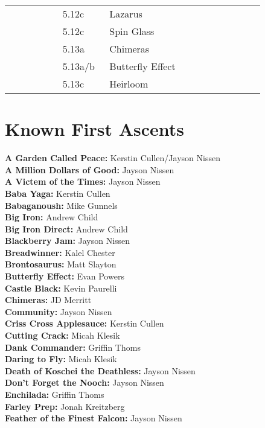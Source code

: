 \begin{flushleft}
\begin{center}
\begin{supertabular}{p{0.18\linewidth}p{0.13\linewidth}p{0.45\linewidth}p{0.08\linewidth}}
&5.12c&Lazarus & \pageref{vr:Lazarus} \\
&5.12c&Spin Glass & \pageref{rt:Spin Glass} \\
&5.13a&Chimeras & \pageref{rt:Chimeras} \\
&5.13a/b&Butterfly Effect & \pageref{rt:Butterfly Effect} \\
&5.13c&Heirloom & \pageref{rt:Heirloom} \\
\end{supertabular}
\end{center}
\section{Known First Ascents}
\textbf{A Garden Called Peace:} Kerstin Cullen/Jayson Nissen\\
\textbf{A Million Dollars of Good:} Jayson Nissen\\
\textbf{A Victem of the Times:} Jayson Nissen\\
\textbf{Baba Yaga:} Kerstin Cullen\\
\textbf{Babaganoush:} Mike Gunnels\\
\textbf{Big Iron:} Andrew Child\\
\textbf{Big Iron Direct:} Andrew Child\\
\textbf{Blackberry Jam:} Jayson Nissen\\
\textbf{Breadwinner:} Kalel Chester\\
\textbf{Brontosaurus:} Matt Slayton\\
\textbf{Butterfly Effect:} Evan Powers\\
\textbf{Castle Black:} Kevin Paurelli\\
\textbf{Chimeras:} JD Merritt\\
\textbf{Community:} Jayson Nissen\\
\textbf{Criss Cross Applesauce:} Kerstin Cullen\\
\textbf{Cutting Crack:} Micah Klesik\\
\textbf{Dank Commander:} Griffin Thoms\\
\textbf{Daring to Fly:} Micah Klesik\\
\textbf{Death of Koschei the Deathless:} Jayson Nissen\\
\textbf{Don't Forget the Nooch:} Jayson Nissen\\
\textbf{Enchilada:} Griffin Thoms\\
\textbf{Farley Prep:} Jonah Kreitzberg\\
\textbf{Feather of the Finest Falcon:} Jayson Nissen\\

\end{flushleft}
